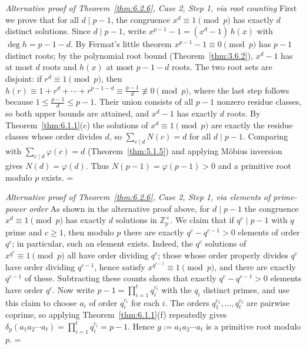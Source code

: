 \documentclass[11pt]{article}
\makeatletter
\theoremstyle{ntstyle}
\let\nt@closedisplay\]
\def\nt@guardedclose{\@ifnextchar\par{\nt@closeafterpar}{\@ifnextchar\end{\postdisplaypenalty\@M\nt@closedisplay}{\nt@closedisplay}}}
\def\nt@closeafterpar\par{\@ifnextchar\par{\nt@closeafterpar}{\@ifnextchar\end{\postdisplaypenalty\@M\nt@closedisplay\par}{\nt@closedisplay\par}}}
\renewenvironment{proof}[1][\proofname]{\par
  \pushQED{\qed}\normalfont\topsep\medskipamount\edef\nt@afterproof{\@endparpenalty=\the\@endparpenalty\relax}\@beginparpenalty\@M\@endparpenalty\@M\let\]\nt@guardedclose\trivlist\item[]\textit{#1\@addpunct{.}} \ignorespaces}{\ifvmode\addpenalty\@M\fi\popQED\nt@afterproof\endtrivlist\@endpefalse}
\newenvironment{altproof}[1][\proofname]{\begin{proof}[#1]}{\end{proof}}
\newcommand{\ZmodUnits}[1]{\mathbb{Z}_{#1}^{\times}}
\makeatother
\begin{document}
\begin{altproof}[Alternative proof of Theorem~\ref{thm:6.2.6}, Case 2, Step 1, via root counting]
First we prove that for all $d \mid p-1$, the congruence $x^{d}
		\equiv 1 \pmod{p}$ has exactly $d$ distinct solutions. Since $d \mid
		p-1$, write $x^{p-1} - 1 = (x^{d} - 1)\,h(x)$ with $\deg h = p - 1 -
		d$. By Fermat's little theorem $x^{p-1} - 1 \equiv 0 \pmod{p}$ has
	$p-1$ distinct roots; by the polynomial root bound
	(Theorem~\ref{thm:3.6.2}), $x^{d} - 1$ has at most $d$ roots
	and $h(x)$ at most $p-1-d$ roots.
		The two root sets are disjoint: if $r^{d}\equiv1\pmod{p}$, then
		$h(r)\equiv1+r^{d}+\cdots+r^{p-1-d}\equiv\frac{p-1}{d}\not\equiv0\pmod{p}$, where the last step
		follows because $1\le\frac{p-1}{d}\le p-1$.
		Their union consists of all $p-1$ nonzero residue classes, so both upper bounds are attained, and
		$x^d-1$ has exactly $d$ roots.
		By Theorem~\ref{thm:6.1.1}(c) the solutions of $x^{d}\equiv1\pmod{p}$ are exactly the residue
		classes whose order divides $d$, so $\sum_{c \mid d} N(c) = d$
	for all $d \mid p-1$. Comparing with $\sum_{c \mid d} \varphi(c) = d$ (Theorem~\ref{thm:5.1.5})
	and applying M{\"o}bius inversion gives $N(d) = \varphi(d)$. Thus
	$N(p-1) = \varphi(p-1) > 0$ and a primitive root modulo $p$ exists.
\end{altproof}
\begin{altproof}[Alternative proof of Theorem~\ref{thm:6.2.6}, Case 2, Step 1, via elements of prime-power order]
	As shown in the alternative proof above, for $d \mid p-1$ the congruence $x^{d}
		\equiv 1 \pmod{p}$ has exactly $d$ solutions in
	$\ZmodUnits{p}$. We claim that if $q^{c} \mid p-1$ with $q$ prime
	and $c \ge 1$, then modulo $p$ there are exactly $q^{c} - q^{c-1} >
		0$ elements of order $q^{c}$; in particular, such an element exists.
	Indeed, the $q^{c}$ solutions of $x^{q^{c}} \equiv 1 \pmod{p}$ all
	have order dividing $q^{c}$; those whose order properly divides
	$q^{c}$ have order dividing $q^{c-1}$, hence satisfy $x^{q^{c-1}}
		\equiv 1 \pmod{p}$, and there are exactly $q^{c-1}$ of these.
	Subtracting these counts shows that exactly $q^{c} - q^{c-1} > 0$ elements have order
	$q^{c}$. Now write $p-1 = \prod_{i=1}^{t} q_i^{c_i}$ with the $q_i$
	distinct primes, and use this claim to choose $a_i$ of order
	$q_i^{c_i}$ for each $i$. The orders $q_1^{c_1}, \ldots, q_t^{c_t}$
	are pairwise coprime, so applying Theorem~\ref{thm:6.1.1}(f) repeatedly gives
	$\delta_p(a_1 a_2 \cdots a_t) = \prod_{i=1}^{t} q_i^{c_i} = p-1$.
	Hence $g := a_1 a_2 \cdots a_t$ is a primitive root modulo $p$.
\end{altproof}
\end{document}
